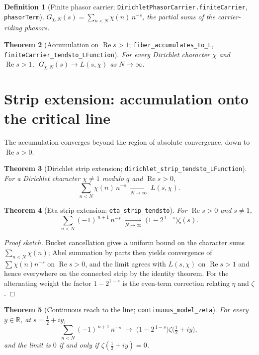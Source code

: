 \documentclass[11pt]{article}
\newtheorem{definition}{Definition}[section]
\newtheorem{theorem}[definition]{Theorem}
\DeclareMathOperator{\Ree}{Re}
\newcommand{\R}{\mathbb{R}}
\newcommand{\code}[1]{\texttt{#1}}
\begin{document}
\begin{definition}[Finite phasor carrier; \code{DirichletPhasorCarrier.finiteCarrier}, \code{phasorTerm}]\label{def:finite}
$G_{\chi,N}(s)=\sum_{n<N}\chi(n)\,n^{-s}$, the partial sums of the carrier-riding phasors.
\end{definition}

\begin{theorem}[Accumulation on $\Ree s>1$; \code{fiber\_accumulates\_to\_L}, \code{finiteCarrier\_tendsto\_LFunction}]\label{thm:accum}
For every Dirichlet character $\chi$ and $\Ree s>1$, $\;G_{\chi,N}(s)\to L(s,\chi)$ as $N\to\infty$.
\end{theorem}

\section{Strip extension: accumulation onto the critical line}\label{sec:strip}

The accumulation converges beyond the region of absolute convergence, down to $\Ree s>0$.

\begin{theorem}[Dirichlet strip extension; \code{dirichlet\_strip\_tendsto\_LFunction}]\label{thm:dstrip}
For a Dirichlet character $\chi\neq 1$ modulo $q$ and $\Ree s>0$,
\[
  \sum_{n<N}\chi(n)\,n^{-s}\;\xrightarrow[N\to\infty]{}\;L(s,\chi).
\]
\end{theorem}

\begin{theorem}[Eta strip extension; \code{eta\_strip\_tendsto}]\label{thm:etastrip}
For $\Ree s>0$ and $s\neq 1$,
\[
  \sum_{n<N}(-1)^{\,n+1}\,n^{-s}\;\xrightarrow[N\to\infty]{}\;\bigl(1-2^{\,1-s}\bigr)\zeta(s).
\]
\end{theorem}

\begin{proof}[Proof sketch]
Bucket cancellation gives a uniform bound on the character sums $\sum_{n<N}\chi(n)$; Abel summation
by parts \cite{Apostol1976,Titchmarsh1986} then yields convergence of $\sum\chi(n)n^{-s}$ on
$\Ree s>0$, and the limit agrees with
$L(s,\chi)$ on $\Ree s>1$ and hence everywhere on the connected strip by the identity theorem. For
the alternating weight the factor $1-2^{1-s}$ is the even-term correction relating $\eta$ and $\zeta$.
\end{proof}

\begin{theorem}[Continuous reach to the line; \code{continuous\_model\_zeta}]\label{thm:cont}
For every $y\in\R$, at $s=\tfrac12+iy$,
\[
  \sum_{n<N}(-1)^{\,n+1}\,n^{-s}\;\longrightarrow\;\bigl(1-2^{\,1-s}\bigr)\zeta\!\bigl(\tfrac12+iy\bigr),
\]
and the limit is $0$ if and only if $\zeta(\tfrac12+iy)=0$.
\end{theorem}
\end{document}
